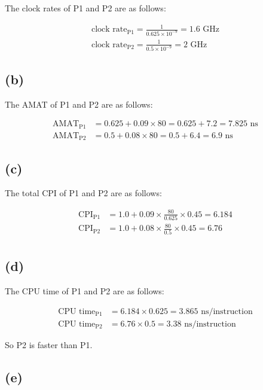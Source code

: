 \documentclass[12pt]{article}
\begin{document}
The clock rates of P1 and P2 are as follows:

\begin{align*}
    \text{clock\ rate}_\text{P1} = \frac{1}{0.625 \times 10^{-9}} = 1.6 \text{ GHz} \\
    \text{clock\ rate}_\text{P2} = \frac{1}{0.5 \times 10^{-9}} = 2 \text{ GHz}
\end{align*}

\subsection*{(b)}

The AMAT of P1 and P2 are as follows:

\begin{align*}
    \text{AMAT}_\text{P1} &= 0.625 + 0.09 \times 80 = 0.625 + 7.2 = 7.825 \text{ ns} \\
    \text{AMAT}_\text{P2} &= 0.5 + 0.08 \times 80 = 0.5 + 6.4 = 6.9 \text{ ns}
\end{align*}

\subsection*{(c)}

The total CPI of P1 and P2 are as follows:

\begin{align*}
    \text{CPI}_\text{P1} &= 1.0 + 0.09 \times \frac{80}{0.625} \times 0.45 = 6.184 \\
    \text{CPI}_\text{P2} &= 1.0 + 0.08 \times \frac{80}{0.5} \times 0.45 = 6.76 \\
\end{align*}

\subsection*{(d)}

The CPU time of P1 and P2 are as follows:

\begin{align*}
    \text{CPU time}_\text{P1} &= 6.184 \times 0.625 = 3.865 \text{ ns/instruction} \\
    \text{CPU time}_\text{P2} &= 6.76 \times 0.5 = 3.38 \text{ ns/instruction}
\end{align*}

So P2 is faster than P1.

\subsection*{(e)}
\end{document}
